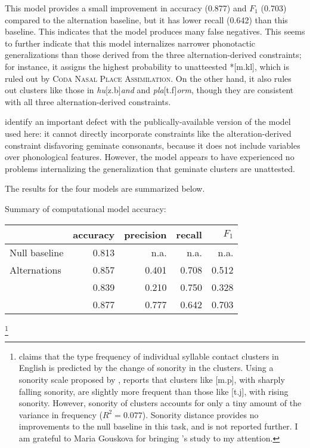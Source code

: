 This model provides a small improvement in accuracy (0.877) and $F_1$ (0.703) compared to the alternation baseline, but it has lower recall (0.642) than this baseline. This indicates that the model produces many false negatives.
This seems to further indicate that this model internalizes narrower phonotactic generalizations than those derived from the three alternation-derived constraints; for instance, it assigns the highest probability to unatteested *[m.kl], which is ruled out by \textsc{Coda Nasal Place Assimilation}. On the other hand, it also rules out clusters like those in \emph{hu}[z.b]\emph{and} and \emph{pla}[t.f]\emph{orm}, though they are consistent with all three alternation-derived constraints. 

\citet{Berent2012} identify an important defect with the publically-available version of the \citeauthor{Hayes2008a} model used here: it cannot directly incorporate constraints like the alteration-derived constraint disfavoring geminate consonants, because it does not include variables over phonological features. However, the model appears to have experienced no problems internalizing the generalization that geminate clusters are unattested. 

The results for the four models are summarized below.

\ex Summary of computational model accuracy: \vspace{6pt} \\
\begin{tabular}{l | r r r r}
\toprule
                          & accuracy & precision & recall & $F_1$ \\ 
\midrule
Null baseline             & 0.813    & n.a.      & n.a.   & n.a.  \\
Alternations              & 0.857    & 0.401     & 0.708  & 0.512 \\
\citet{Pierrehumbert1994} & 0.839    & 0.210     & 0.750  & 0.328 \\
\citet{Hayes2008a}        & 0.877    & 0.777     & 0.642  & 0.703 \\
\bottomrule
\end{tabular}
\xe

\footnote{\citet{McGowan2011} claims that the type frequency of individual syllable contact clusters in English is predicted by the change of sonority in the clusters. Using a sonority scale proposed by \citet{Jespersen1904}, \citeauthor{McGowan2011} reports that clusters like [m.p], with sharply falling sonority, are slightly more frequent than those like [t.j], with rising sonority. However, sonority of clusters accounts for only a tiny amount of the variance in frequency ($R^2 = 0.077$). Sonority distance provides no improvements to the null baseline in this task, and is not reported further. I am grateful to Maria Gouskova for bringing \citeauthor{McGowan2011}'s study to my attention.}
